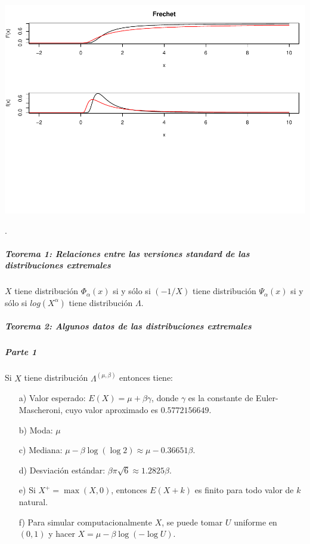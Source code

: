 \documentclass[
  12pt]{article}
\begin{document}
\includegraphics{extremales_files/figure-latex/unnamed-chunk-20-1.pdf}

.

\newpage

\hypertarget{teorema-1-relaciones-entre-las-versiones-standard-de-las-distribuciones-extremales}{%
\subparagraph{Teorema 1: Relaciones entre las versiones standard de las
distribuciones
extremales}\label{teorema-1-relaciones-entre-las-versiones-standard-de-las-distribuciones-extremales}}

\(X\) tiene distribución \(\Phi_{\alpha}(x)\) si y sólo si \((-1/X)\)
tiene distribución \(\Psi_{\alpha}(x)\) si y sólo si \(log(X^{\alpha})\)
tiene distribución \(\Lambda\).

\hypertarget{teorema-2-algunos-datos-de-las-distribuciones-extremales}{%
\subparagraph{Teorema 2: Algunos datos de las distribuciones
extremales}\label{teorema-2-algunos-datos-de-las-distribuciones-extremales}}

\hypertarget{parte-1}{%
\subparagraph{Parte 1}\label{parte-1}}

Si \(X\) tiene distribución \(\Lambda^{(\mu,\beta)}\) entonces tiene:

\begin{itemize}
  \item[a)] Valor esperado: $E(X) = \mu + \beta\gamma$, donde $\gamma$ es la constante de Euler-Mascheroni, cuyo valor aproximado es $0.5772156649$.
  \item[b)] Moda: $\mu$
  \item[c)] Mediana: $\mu - \beta \log(\log 2) \approx \mu - 0.36651 \beta$.
  \item[d)] Desviación estándar: $\beta \pi \sqrt{6} \approx 1.2825 \beta$.
  \item[e)] Si $X^+ = \max(X,0)$, entonces $E(X+k)$ es finito para todo valor de $k$ natural.
  \item[f)] Para simular computacionalmente $X$, se puede tomar $U$ uniforme en $(0,1)$ y hacer $X = \mu - \beta \log(-\log U)$.
\end{itemize}
\end{document}
